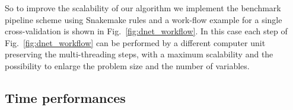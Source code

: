 \documentclass{standalone}
\begin{document}
So to improve the scalability of our algorithm we implement the benchmark pipeline scheme using Snakemake rules and a work-flow example for a single cross-validation is shown in Fig.~\ref{fig:dnet_workflow}.
In this case each step of Fig.~\ref{fig:dnet_workflow} can be performed by a different computer unit preserving the multi-threading steps, with a maximum scalability and the possibility to enlarge the problem size and the number of variables.



\subsection[Time performances]{Time performances}\label{implementation:timing}


\end{document}
